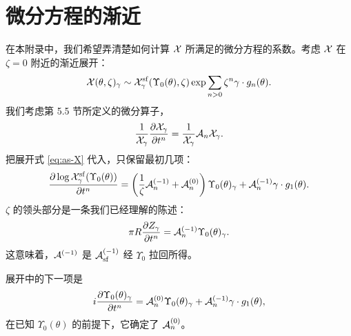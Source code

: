 \providecommand{\plog}[1]{#1\partial_{#1}}
\section{微分方程的渐近}
\label{app:diff-asymptotics}

在本附录中，我们希望弄清楚如何计算 $\mathcal{X}$ 所满足的微分方程的系数。考虑 $\mathcal{X}$ 在 $\zeta=0$ 附近的渐近展开：
\begin{equation} \label{eq:as-X}
\mathcal{X}(\theta,\zeta)_\gamma \sim
\mathcal{X}^{\mathrm{sf}}_\gamma(\Upsilon_0(\theta),\zeta) \exp \sum_{n>0} \zeta^n
\gamma \cdot g_n(\theta).
\end{equation}
我们考虑第 5.5 节所定义的微分算子，%
\begin{equation}
\frac{1}{\mathcal{X}_\gamma}\frac{\partial \mathcal{X}_\gamma}{\partial t^n}  =
\frac{1}{\mathcal{X}_\gamma} \mathcal{A}_n \mathcal{X}_\gamma.
\end{equation}
把展开式 \eqref{eq:as-X} 代入，只保留最初几项：
\begin{equation}
\frac{\partial \log \mathcal{X}^{\mathrm{sf}}_\gamma(\Upsilon_0(\theta))}{\partial
t^n} = \left(\frac{1}{\zeta}\mathcal{A}^{(-1)}_n + \mathcal{A}^{(0)}_n\right)
\Upsilon_0(\theta)_\gamma+ \mathcal{A}_n^{(-1)} \gamma \cdot g_1(\theta).
\end{equation}
$\zeta$ 的领头部分是一条我们已经理解的陈述：
\begin{equation}
\pi R \frac{\partial Z_\gamma}{\partial t^n} = \mathcal{A}^{(-1)}_n
\Upsilon_0(\theta)_\gamma.
\end{equation}
这意味着，$\mathcal{A}^{(-1)}$ 是 $\mathcal{A}^{(-1)}_{\mathrm{sf}}$ 经 $\Upsilon_0$ 拉回所得。

展开中的下一项是
\begin{equation}
i \frac{\partial \Upsilon_0(\theta)_\gamma}{\partial t^n} =
\mathcal{A}^{(0)}_n \Upsilon_0(\theta)_\gamma+ \mathcal{A}_n^{(-1)} \gamma \cdot
g_1(\theta),
\end{equation}
在已知 $\Upsilon_0(\theta)$ 的前提下，它确定了 $\mathcal{A}^{(0)}_n$。

